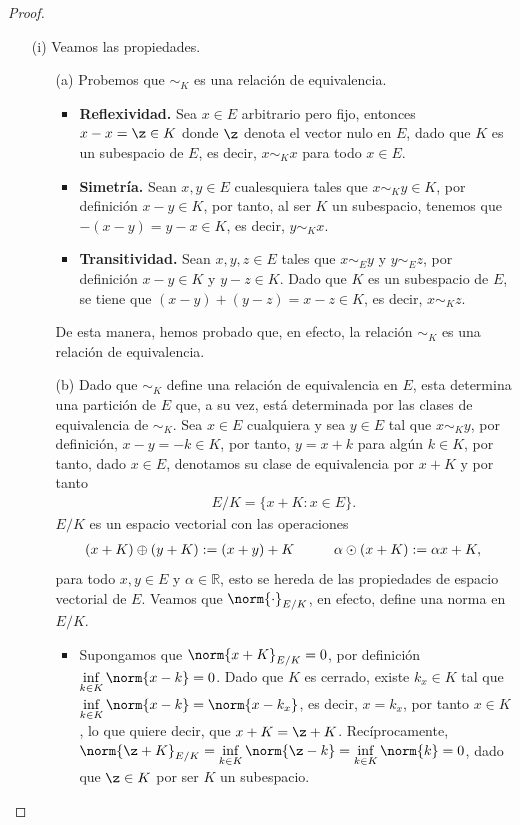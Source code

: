\begin{proof}
    \begin{enumerate}
    \item[(i)] Veamos las propiedades.
    \begin{enumerate}
        \item[(a)] Probemos que $\sim_K$ es una relación de equivalencia.
        \begin{itemize}
            \item \textbf{Reflexividad.} Sea $x\in E$ arbitrario pero fijo, entonces $x-x=\z\in K$ donde $\z$ denota el vector nulo en $E$, dado que $K$ es un subespacio de $E$, es decir, $x\sim_K x$ para todo $x \in E$.
            \item \textbf{Simetría.} Sean $x,y \in E$ cualesquiera tales que $x\sim_K y \in K$, por definición $x-y \in K$, por tanto, al ser $K$ un subespacio, tenemos que $-(x-y)=y-x \in K$, es decir, $y\sim_K x$.
            \item \textbf{Transitividad.} Sean $x,y,z\in E$ tales que $x\sim_E y$ y $y\sim_E z$, por definición $x-y \in K$ y $y-z\in K$. Dado que $K$ es un subespacio de $E$, se tiene que $(x-y)+(y-z)=x-z\in K$, es decir, $x\sim_K z$.
        \end{itemize}
        De esta manera, hemos probado que, en efecto, la relación $\sim_K$ es una relación de equivalencia.
        \item[(b)] Dado que $\sim_K$ define una relación de equivalencia en $E$, esta determina una partición de $E$ que, a su vez, está determinada por las clases de equivalencia de $\sim_K$. Sea $x \in E$ cualquiera y sea $y \in E$ tal que $x\sim_K y$, por definición, $x-y=-k \in K$, por tanto, $y=x+k$ para algún $k \in K$, por tanto, dado $x \in E$, denotamos su clase de equivalencia por $x+K$ y por tanto
        \begin{align*}
            E/K=\{x+K:x \in E\}.
        \end{align*}
        $E/K$ es un espacio vectorial con las operaciones 
        \begin{align*}
            (x+K)\oplus (y+K):= (x+y)+K \hspace{10mm} \alpha\odot(x+K):=\alpha x+K,
        \end{align*}
        para todo $x,y \in E$ y $\alpha\in \mathbb{R}$, esto se hereda de las propiedades de espacio vectorial de $E$. Veamos que $\norm{\cdot}_{E/K}$, en efecto, define una norma en $E/K$.
        \begin{itemize}
            \item Supongamos que $\norm{x+K}_{E/K}=0$, por definición $\displaystyle \inf_{k\in K}\norm{x-k}=0$. Dado que $K$ es cerrado, existe $k_x \in K$ tal que $\displaystyle\inf_{k \in K}\norm{x-k}=\norm{x-k_x}$, es decir, $x=k_x$, por tanto $x \in K$, lo que quiere decir, que $x+K=\z+K$. Recíprocamente, $\displaystyle \norm{\z+K}_{E/K}=\inf_{k \in K}\norm{\z-k}=\inf_{k \in K}\norm{k}=0$, dado que $\z \in K$ por ser $K$ un subespacio.

\end{itemize}
\end{enumerate}
\end{enumerate}
\end{proof}
